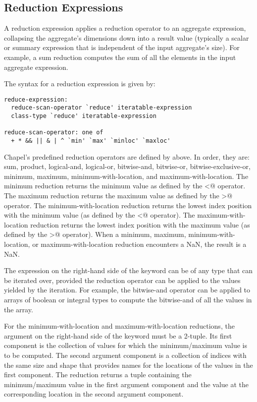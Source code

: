 \subsection{Reduction Expressions}
\label{reduce}

A reduction expression applies a reduction operator to an aggregate
expression, collapsing the aggregate's dimensions down into a result
value (typically a scalar or summary expression that is independent of
the input aggregate's size).  For example, a sum reduction computes
the sum of all the elements in the input aggregate expression.

The syntax for a reduction expression is given by:
\begin{syntax}
\begin{verbatim}
reduce-expression:
  reduce-scan-operator `reduce' iteratable-expression
  class-type `reduce' iteratable-expression

reduce-scan-operator: one of
  + * && || & | ^ `min' `max' `minloc' `maxloc'
\end{verbatim}
\end{syntax}

Chapel's predefined reduction operators are defined
by  above.  In order, they are: sum,
product, logical-and, logical-or, bitwise-and, bitwise-or,
bitwise-exclusive-or, minimum, maximum, minimum-with-location, and
maximum-with-location.  The minimum reduction returns the minimum
value as defined by the \verb@<@ operator.  The maximum reduction
returns the maximum value as defined by the \verb@>@ operator.  The
minimum-with-location reduction returns the lowest index position with
the minimum value (as defined by the \verb@<@ operator).  The
maximum-with-location reduction returns the lowest index position with
the maximum value (as defined by the \verb@>@ operator).
When a minimum, maximum, minimum-with-location, or maximum-with-location
reduction encounters a NaN, the result is a NaN.

The expression on the right-hand side of the  keyword
can be of any type that can be iterated over, provided
the reduction operator can be applied to the values yielded
by the iteration. For example, the bitwise-and
operator can be applied to arrays of boolean or integral types to
compute the bitwise-and of all the values in the array.

For the minimum-with-location and maximum-with-location reductions,
the argument on the right-hand side of the  keyword
must be a 2-tuple. Its first component is the collection
of values for which the minimum/maximum value is to be computed.  The
second argument component is a collection of indices with the same size and
shape that provides names for the locations of the values in the first
component.  The reduction returns a tuple containing the
minimum/maximum value in the first argument component and the value
at the corresponding location in the second argument component.

